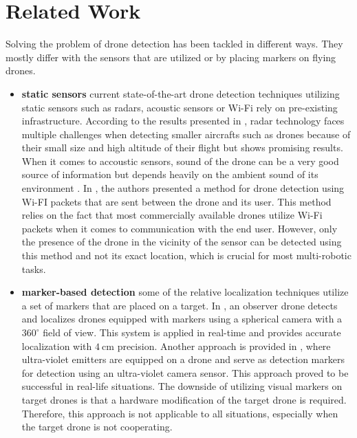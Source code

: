 \documentclass[twoside]{ctuthesis}
\theoremstyle{plain}
\theoremstyle{definition}
\theoremstyle{note}
\begin{document}
\section{Related Work}
Solving the problem of drone detection has been tackled in different ways. They mostly differ with the sensors that are utilized or by placing markers on flying drones.
\begin{itemize}
	\item \textbf{static sensors} current state-of-the-art drone detection techniques utilizing static sensors such as radars, acoustic sensors or Wi-Fi rely on pre-existing infrastructure. According to the results presented in \cite{8337899}, radar technology faces multiple challenges when detecting smaller aircrafts such as drones because of their small size and high altitude of their flight but shows promising results. When it comes to accoustic sensors, sound of the drone can be a very good source of information but depends heavily on the ambient sound of its environment \cite{8337899}. In \cite{drone-det-wifi}, the authors presented a method for drone detection using Wi-FI packets that are sent between the drone and its user. This method relies on the fact that most commercially available drones utilize Wi-Fi packets when it comes to communication with the end user. However, only the presence of the drone in the vicinity of the sensor can be detected using this method and not its exact location, which is crucial for most multi-robotic tasks.
	\item \textbf{marker-based detection} some of the relative localization techniques utilize a set of markers that are placed on a target. In \cite{holter2020relative}, an observer drone detects and localizes drones equipped with markers using a spherical camera with a $360^\circ$ field of view. This system is applied in real-time and provides accurate localization with $\SI{4}{\centi \metre}$ precision. Another approach is provided in \cite{8651535}, where ultra-violet emitters are equipped on a drone and serve as detection markers for detection using an ultra-violet camera sensor. This approach proved to be successful in real-life situations. The downside of utilizing visual markers on target drones is that a hardware modification of the target drone is required. Therefore, this approach is not applicable to all situations, especially when the target drone is not cooperating.

\end{itemize}
\end{document}
